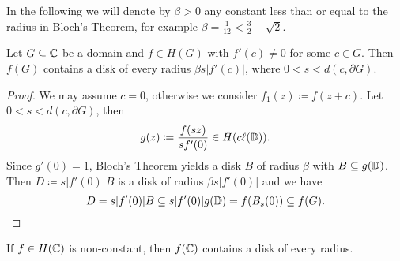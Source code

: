 In the following we will denote by $\beta > 0$ any constant less than or equal to the radius in Bloch's Theorem, for example $\beta = \frac{1}{12} < \frac{3}{2} - \sqrt{2}$.

\begin{corollary} \label{cor:bloch-domain}
    Let $G \subseteq \mathbb{C}$ be a domain and $f \in H(G)$ with $f'(c) \neq 0$ for some $c \in G$. Then $f(G)$ contains a disk of every radius $\beta s \vert f'(c) \vert$, where $0 < s < d(c, \partial G)$.
\end{corollary}

\begin{proof}
    We may assume $c = 0$, otherwise we consider $f_1(z) \coloneqq f(z+c)$. Let $0 < s < d(c, \partial G)$, then
    $$ g(z) \coloneqq \frac{f(sz)}{sf'(0)} \in H(c\ell({\mathbb{D}})). $$
    Since $g'(0) = 1$, Bloch's Theorem yields a disk $B$ of radius $\beta$ with $B \subseteq g(\mathbb{D})$. Then $D \coloneqq s \vert f'(0) \vert B$ is a disk of radius $\beta s \vert f'(0) \vert$ and we have
    \begin{equation*}
        D = s \vert f'(0) \vert B \subseteq s \vert f'(0) \vert g(\mathbb{D}) = f(B_s(0)) \subseteq f(G). \qedhere
    \end{equation*}
\end{proof}

\begin{corollary} \label{cor:bloch-entire}
    If $f \in H(\mathbb{C})$ is non-constant, then $f(\mathbb{C})$ contains a disk of every radius.
\end{corollary}